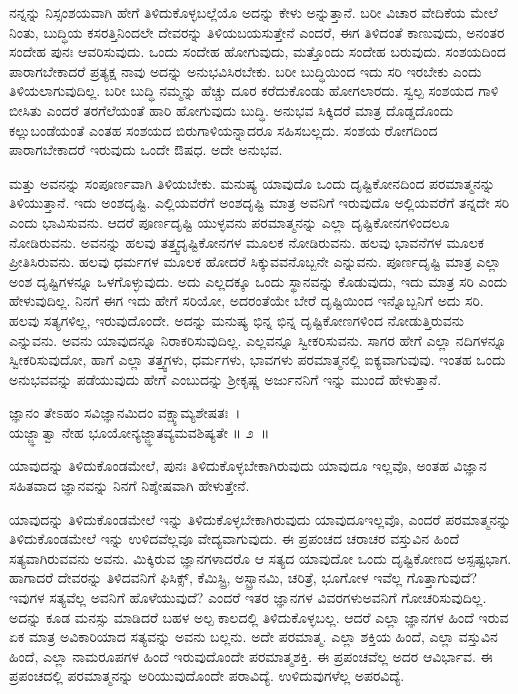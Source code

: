 ನನ್ನನ್ನು ನಿಸ್ಸಂಶಯವಾಗಿ ಹೇಗೆ ತಿಳಿದುಕೊಳ್ಳಬಲ್ಲೆಯೊ ಅದನ್ನು ಕೇಳು ಅನ್ನುತ್ತಾನೆ. ಬರೀ ವಿಚಾರ ವೇದಿಕೆಯ ಮೇಲೆ ನಿಂತು, ಬುದ್ಧಿಯ ಕಸರತ್ತಿನಿಂದಲೇ ದೇವರನ್ನು ತಿಳಿಯಬಯಸುತ್ತೇನೆ ಎಂದರೆ, ಈಗ ತಿಳಿದಂತೆ ಕಾಣುವುದು, ಅನಂತರ ಸಂದೇಹ ಪುನಃ ಆವರಿಸುವುದು. ಒಂದು ಸಂದೇಹ ಹೋಗುವುದು, ಮತ್ತೊಂದು ಸಂದೇಹ ಬರುವುದು. ಸಂಶಯದಿಂದ ಪಾರಾಗಬೇಕಾದರೆ ಪ್ರತ್ಯಕ್ಷ ನಾವು ಅದನ್ನು ಅನುಭವಿಸಿರಬೇಕು. ಬರೀ ಬುದ್ಧಿಯಿಂದ ಇದು ಸರಿ ಇರಬೇಕು ಎಂದು ತಿಳಿಯಲಾಗುವುದಿಲ್ಲ. ಬರೀ ಬುದ್ಧಿ ನಮ್ಮನ್ನು ಹೆಚ್ಚು ದೂರ ಕರೆದುಕೊಂಡು ಹೋಗಲಾರದು. ಸ್ವಲ್ಪ ಸಂಶಯದ ಗಾಳಿ ಬೀಸಿತು ಎಂದರೆ ತರಗೆಲೆಯಂತೆ ಹಾರಿ ಹೋಗುವುದು ಬುದ್ಧಿ. ಅನುಭವ ಸಿಕ್ಕಿದರೆ ಮಾತ್ರ ದೊಡ್ಡದೊಂದು ಕಲ್ಲುಬಂಡೆಯಂತೆ ಎಂತಹ ಸಂಶಯದ ಬಿರುಗಾಳಿಯನ್ನಾದರೂ ಸಹಿಸಬಲ್ಲದು. ಸಂಶಯ ರೋಗದಿಂದ ಪಾರಾಗಬೇಕಾದರೆ ಇರುವುದು ಒಂದೇ ಔಷಧ. ಅದೇ ಅನುಭವ. 

ಮತ್ತು ಅವನನ್ನು ಸಂಪೂರ್ಣವಾಗಿ ತಿಳಿಯಬೇಕು. ಮನುಷ್ಯ ಯಾವುದೊ ಒಂದು ದೃಷ್ಟಿಕೋನದಿಂದ ಪರಮಾತ್ಮನನ್ನು ತಿಳಿಯುತ್ತಾನೆ. ಇದು ಅಂಶದೃಷ್ಟಿ. ಎಲ್ಲಿಯವರೆಗೆ ಅಂಶದೃಷ್ಟಿ ಮಾತ್ರ ಅವನಿಗೆ ಇರುವುದೊ ಅಲ್ಲಿಯವರೆಗೆ ತನ್ನದೇ ಸರಿ ಎಂದು ಭಾವಿಸುವನು. ಆದರೆ ಪೂರ್ಣದೃಷ್ಟಿ ಯುಳ್ಳವನು ಪರಮಾತ್ಮನನ್ನು ಎಲ್ಲಾ ದೃಷ್ಟಿಕೋನಗಳಿಂದಲೂ ನೋಡಿರುವನು. ಅವನನ್ನು ಹಲವು ತತ್ತ್ವದೃಷ್ಟಿಕೋನಗಳ ಮೂಲಕ ನೋಡಿರುವನು. ಹಲವು ಭಾವನೆಗಳ ಮೂಲಕ ಪ್ರೀತಿಸಿರುವನು. ಹಲವು ಧರ್ಮಗಳ ಮೂಲಕ ಹೋದರೆ ಸಿಕ್ಕುವವನೊಬ್ಬನೇ ಎನ್ನುವನು. ಪೂರ್ಣದೃಷ್ಟಿ ಮಾತ್ರ ಎಲ್ಲಾ ಅಂಶ ದೃಷ್ಟಿಗಳನ್ನೂ ಒಳಗೊಳ್ಳುವುದು. ಅದು ಎಲ್ಲದಕ್ಕೂ ಒಂದು ಸ್ಥಾನವನ್ನು ಕೊಡುವುದು, ಇದು ಮಾತ್ರ ಸರಿ ಎಂದು ಹೇಳುವುದಿಲ್ಲ. ನಿನಗೆ ಈಗ ಇದು ಹೇಗೆ ಸರಿಯೋ, ಅದರಂತೆಯೇ ಬೇರೆ ದೃಷ್ಟಿಯಿಂದ ಇನ್ನೊಬ್ಬನಿಗೆ ಅದು ಸರಿ. ಹಲವು ಸತ್ಯಗಳಿಲ್ಲ, ಇರುವುದೊಂದೇ. ಅದನ್ನು ಮನುಷ್ಯ ಭಿನ್ನ ಭಿನ್ನ ದೃಷ್ಟಿಕೋಣಗಳಿಂದ ನೋಡುತ್ತಿರುವನು ಎನ್ನುವನು. ಅವನು ಯಾವುದನ್ನೂ ನಿರಾಕರಿಸುವುದಿಲ್ಲ. ಎಲ್ಲವನ್ನೂ ಸ್ವೀಕರಿಸುವನು. ಸಾಗರ ಹೇಗೆ ಎಲ್ಲಾ ನದಿಗಳನ್ನೂ ಸ್ವೀಕರಿಸುವುದೋ, ಹಾಗೆ ಎಲ್ಲಾ ತತ್ತ್ವಗಳು, ಧರ್ಮಗಳು, ಭಾವಗಳು ಪರಮಾತ್ಮನಲ್ಲಿ ಐಕ್ಯವಾಗುವುವು. ಇಂತಹ ಒಂದು ಅನುಭವವನ್ನು ಪಡೆಯುವುದು ಹೇಗೆ ಎಂಬುದನ್ನು ಶ‍್ರೀಕೃಷ್ಣ ಅರ್ಜುನನಿಗೆ ಇನ್ನು ಮುಂದೆ ಹೇಳುತ್ತಾನೆ.

\begin{shloka}
ಜ್ಞಾನಂ ತೇಽಹಂ ಸವಿಜ್ಞಾನಮಿದಂ ವಕ್ಷ್ಯಾಮ್ಯಶೇಷತಃ~।\\ಯಜ್ಜ್ಞಾತ್ವಾ ನೇಹ ಭೂಯೋನ್ಯಜ್ಜ್ಞಾತವ್ಯಮವಶಿಷ್ಯತೇ \hfill॥ ೨~॥
\end{shloka}

\begin{artha}
ಯಾವುದನ್ನು ತಿಳಿದುಕೊಂಡಮೇಲೆ, ಪುನಃ ತಿಳಿದುಕೊಳ್ಳಬೇಕಾಗಿರುವುದು ಯಾವುದೂ ಇಲ್ಲವೊ, ಅಂತಹ ವಿಜ್ಞಾನ ಸಹಿತವಾದ ಜ್ಞಾನವನ್ನು ನಿನಗೆ ನಿಶ್ಶೇಷವಾಗಿ ಹೇಳುತ್ತೇನೆ.
\end{artha}

ಯಾವುದನ್ನು ತಿಳಿದುಕೊಂಡಮೇಲೆ ಇನ್ನು ತಿಳಿದುಕೊಳ್ಳಬೇಕಾಗಿರುವುದು ಯಾವುದೂ\break ಇಲ್ಲವೊ, ಎಂದರೆ ಪರಮಾತ್ಮನನ್ನು ತಿಳಿದುಕೊಂಡಮೇಲೆ ಇನ್ನು ಉಳಿದವೆಲ್ಲವೂ ವೇದ್ಯವಾಗುವುದು. ಈ ಪ್ರಪಂಚದ ಚರಾಚರ ವಸ್ತುವಿನ ಹಿಂದೆ ಸತ್ಯವಾಗಿರುವವನು ಅವನು. ಮಿಕ್ಕಿರುವ ಜ್ಞಾನಗಳಾದರೊ ಆ ಸತ್ಯದ ಯಾವುದೋ ಒಂದು ದೃಷ್ಟಿಕೋಣದ ಅಸ್ಪಷ್ಟಭಾಗ. ಹಾಗಾದರೆ ದೇವರನ್ನು ತಿಳಿದವನಿಗೆ ಫಿಸಿಕ್ಸ್, ಕೆಮಿಸ್ಟ್ರಿ, ಅಸ್ಟ್ರಾನಮಿ, ಚರಿತ್ರೆ, ಭೂಗೋಳ ಇವೆಲ್ಲ ಗೊತ್ತಾಗು\-ವುದೆ? ಇವುಗಳ ಸತ್ಯವೆಲ್ಲ ಅವನಿಗೆ ಹೊಳೆಯುವುದೆ? ಎಂದರೆ ಇತರ ಜ್ಞಾನಗಳ ವಿವರಗಳು\break ಅವನಿಗೆ ಗೋಚರಿಸುವುದಿಲ್ಲ. ಅದನ್ನು ಕೂಡ ಮನಸ್ಸು ಮಾಡಿದರೆ ಬಹಳ ಅಲ್ಪ ಕಾಲದಲ್ಲಿ ತಿಳಿದುಕೊಳ್ಳಬಲ್ಲ. ಆದರೆ ಎಲ್ಲಾ ಜ್ಞಾನಗಳ ಹಿಂದೆ ಇರುವ ಏಕ ಮಾತ್ರ ಅವಿಕಾರಿಯಾದ ಸತ್ಯವನ್ನು ಅವನು ಬಲ್ಲನು. ಅದೇ ಪರಮಾತ್ಮ. ಎಲ್ಲಾ ಶಕ್ತಿಯ ಹಿಂದೆ, ಎಲ್ಲಾ ವಸ್ತುವಿನ ಹಿಂದೆ, ಎಲ್ಲಾ ನಾಮರೂಪಗಳ ಹಿಂದೆ ಇರುವುದೊಂದೇ ಪರಮಾತ್ಮಶಕ್ತಿ. ಈ ಪ್ರಪಂಚವೆಲ್ಲ ಅದರ ಆವಿರ್ಭಾವ. ಈ ಪ್ರಪಂಚದಲ್ಲಿ ಪರಮಾತ್ಮನನ್ನು ಅರಿಯುವುದೊಂದೇ ಪರಾವಿದ್ಯೆ. ಉಳಿದುವುಗಳೆಲ್ಲ ಅಪರವಿದ್ಯೆ.

